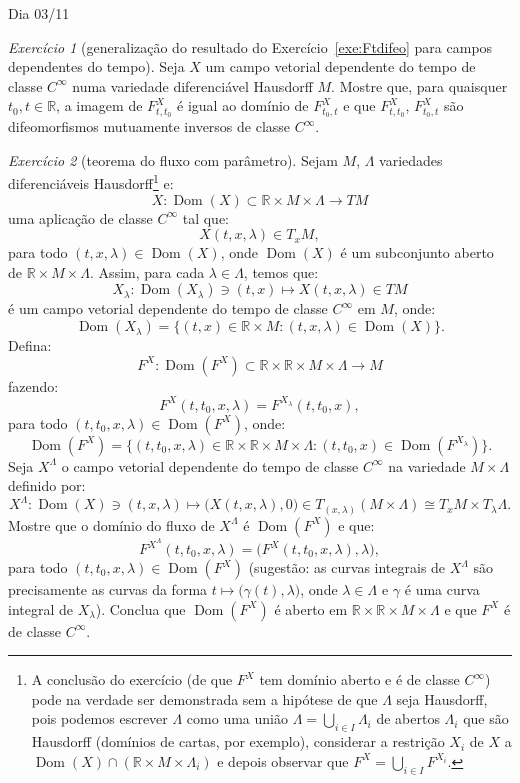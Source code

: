 \documentclass[oneside,11pt]{amsart}
\newcommand{\R}{\mathds R}
\DeclareMathOperator{\Dom}{Dom}
\theoremstyle{remark}\newtheorem{exercise}{Exercício}[section]
\theoremstyle{plain}\newtheorem{teo}{Teorema}[section]
\theoremstyle{plain}\newtheorem{lem}[teo]{Lema}
\theoremstyle{plain}\newtheorem{prop}[teo]{Proposição}
\theoremstyle{definition}\newtheorem{defin}[teo]{Definição}
\theoremstyle{remark}\newtheorem{rem}[teo]{Observação}
\theoremstyle{definition}\newtheorem{example}[teo]{Exemplo}
\numberwithin{equation}{section}
\begin{document}
\begin{section}{Dia 03/11}
\begin{exercise}[generalização do resultado do Exercício~\ref{exe:Ftdifeo} para campos dependentes do tempo]
Seja $X$ um campo vetorial dependente do tempo de classe $C^\infty$ numa variedade diferenciável Hausdorff $M$. Mostre que, para quaisquer $t_0,t\in\R$,
a imagem de $F^X_{t,t_0}$ é igual ao domínio de $F^X_{t_0,t}$ e que $F^X_{t,t_0}$, $F^X_{t_0,t}$ são difeomorfismos mutuamente inversos de classe $C^\infty$.
\end{exercise}

\begin{exercise}[teorema do fluxo com parâmetro]
Sejam $M$, $\Lambda$ variedades diferenciáveis Hausdorff\footnote{%
A conclusão do exercício (de que $F^X$ tem domínio aberto e é de classe $C^\infty$) pode na verdade ser demonstrada sem a hipótese de que $\Lambda$
seja Hausdorff, pois podemos escrever $\Lambda$ como uma união $\Lambda=\bigcup_{i\in I}\Lambda_i$ de abertos $\Lambda_i$
que são Hausdorff (domínios de cartas, por exemplo), considerar a restrição $X_i$ de $X$ a $\Dom(X)\cap(\R\times M\times\Lambda_i)$
e depois observar que $F^X=\bigcup_{i\in I}F^{X_i}$.} e:
\[X:\Dom(X)\subset\R\times M\times\Lambda\longrightarrow TM\]
uma aplicação de classe $C^\infty$ tal que:
\[X(t,x,\lambda)\in T_xM,\]
para todo $(t,x,\lambda)\in\Dom(X)$, onde $\Dom(X)$ é um subconjunto aberto de $\R\times M\times\Lambda$. Assim, para
cada $\lambda\in\Lambda$, temos que:
\[X_\lambda:\Dom(X_\lambda)\ni(t,x)\longmapsto X(t,x,\lambda)\in TM\]
é um campo vetorial dependente do tempo de classe $C^\infty$ em $M$, onde:
\[\Dom(X_\lambda)=\big\{(t,x)\in\R\times M:(t,x,\lambda)\in\Dom(X)\big\}.\]
Defina:
\[F^X:\Dom(F^X)\subset\R\times\R\times M\times\Lambda\longrightarrow M\]
fazendo:
\[F^X(t,t_0,x,\lambda)=F^{X_\lambda}(t,t_0,x),\]
para todo $(t,t_0,x,\lambda)\in\Dom(F^X)$, onde:
\[\Dom(F^X)=\big\{(t,t_0,x,\lambda)\in\R\times\R\times M\times\Lambda:(t,t_0,x)\in\Dom(F^{X_\lambda})\big\}.\]
Seja $X^\Lambda$ o campo vetorial dependente do tempo de classe $C^\infty$ na variedade $M\times\Lambda$ definido por:
\[X^\Lambda:\Dom(X)\ni(t,x,\lambda)\longmapsto\big(X(t,x,\lambda),0\big)\in T_{(x,\lambda)}(M\times\Lambda)\cong T_xM\times T_\lambda\Lambda.\]
Mostre que o domínio do fluxo de $X^\Lambda$ é $\Dom(F^X)$ e que:
\[F^{X^{\Lambda}}(t,t_0,x,\lambda)=\big(F^X(t,t_0,x,\lambda),\lambda\big),\]
para todo $(t,t_0,x,\lambda)\in\Dom(F^X)$ (sugestão: as curvas integrais de $X^\Lambda$ são precisamente as curvas da forma
$t\mapsto\big(\gamma(t),\lambda)$, onde $\lambda\in\Lambda$ e $\gamma$ é uma curva integral de $X_\lambda$).
Conclua que $\Dom(F^X)$ é aberto em $\R\times\R\times M\times\Lambda$ e que $F^X$ é de classe $C^\infty$.
\end{exercise}

\end{section}
\end{document}
